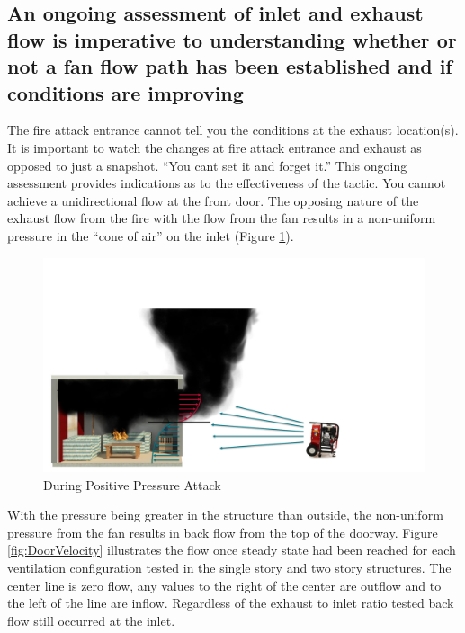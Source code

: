 \documentclass{article}
\begin{document}
\subsection{An ongoing assessment of inlet and exhaust flow is imperative to understanding whether or not a fan flow path has been established and if conditions are improving} \label{sec:OngoingAssessment}

The fire attack entrance cannot tell you the conditions at the exhaust location(s). It is important to watch the changes at fire attack entrance and exhaust as opposed to just a snapshot. “You cant set it and forget it.” This ongoing assessment provides indications as to the effectiveness of the tactic. You cannot achieve a unidirectional flow at the front door. The opposing nature of the exhaust flow from the fire with the flow from the fan results in a non-uniform pressure in the “cone of air” on the inlet (Figure \ref{fig:FanAndDoorFlow}).

\begin{figure}
	\centering
	\includegraphics[width = 6in]{0_Images/Tactical_Considerations/Ongoing_Assessment/FanandDoorFlow.pdf}
	\caption{During Positive Pressure Attack}
	\label{fig:FanAndDoorFlow}
\end{figure}

With the pressure being greater in the structure than outside, the non-uniform pressure from the fan results in back flow from the top of the doorway. Figure \ref{fig:DoorVelocity} illustrates the flow once steady state had been reached for each ventilation configuration tested in the single story and two story structures. The center line is zero flow, any values to the right of the center are outflow and to the left of the line are inflow. Regardless of the exhaust to inlet ratio tested back flow still occurred at the  inlet.
\end{document}
